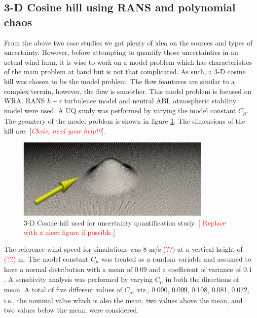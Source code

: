 \documentclass[]{aiaa-tc}%
\begin{document}
\subsection{3-D Cosine hill using RANS and polynomial chaos} \label{cosineHill}
From the above two case studies we got plenty of idea on the sources and types of uncertainty. However, before attempting to quantify those uncertainties in an actual wind farm, it is wise to work on a model problem which has characteristics of the main problem at hand but is not that complicated. As such, a 3-D cosine hill was chosen to be the model problem. The flow feautures are similar to a complex terrain, however, the flow is smoother.  This model problem is focused on WRA.  RANS $k - \epsilon$  turbulence model and neutral ABL atmospheric stability model were used.
A UQ study was performed by varying the model constant $C_{\mu}$. The geomtery of the model problem is shown in figure \ref{f:cosine_hill}. The dimensions of the hill are: [\textcolor{red}{\textit{Chris, need your help!!!}}]. 


\begin{figure}
\centering
 \includegraphics[width=0.85\textwidth]{CosineHill.png}
 \caption{3-D Cosine hill used for uncertainty quantification study. [\textcolor{red}{ Replace with a nicer figure if possible.}] }
 \label{f:cosine_hill}
\end{figure}

The reference wind speed for simulations was 8 m/s \textcolor{red}{(??)} at a vertical height of \textcolor{red}{(??)} m. The  model constant $C_{\mu}$ was treated as a random variable and assumed to have a normal distribution with a mean of $0.09$ and a coefficient of variance of $0.1$. A sensitivity analysis was performed by varying $C_{\mu}$ in both the directions of mean. A total of five different values of $C_{\mu}$, viz., 0.090, 0.099, 0.108, 0.081, 0.072, i.e., the nominal value which is also the mean, two values above the mean, and two values below the mean, were considered.
\end{document}
